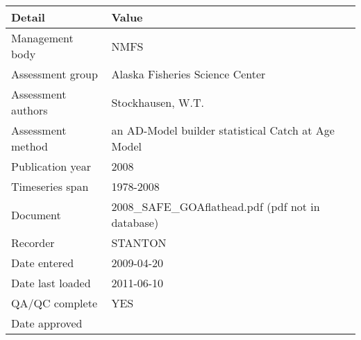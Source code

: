 \begin{table}[htb]
\centering
\begin{tabular}{lp{7cm}}
\toprule
Detail & Value \\
\midrule
Management body    & NMFS                                               \\
Assessment group   & Alaska Fisheries Science Center                    \\
Assessment authors & Stockhausen, W.T.                                  \\
Assessment method  & an AD-Model builder statistical Catch at Age Model \\
Publication year   & 2008                                               \\
Timeseries span    & 1978-2008                                          \\
Document           & 2008\_SAFE\_GOAflathead.pdf (pdf not in database)  \\
Recorder           & STANTON                                            \\
Date entered       & 2009-04-20                                         \\
Date last loaded   & 2011-06-10                                         \\
QA/QC complete     & YES                                                \\
Date approved      &                                                    \\
\bottomrule
\end{tabular}
\label{tab:assessdet}
\end{table}
